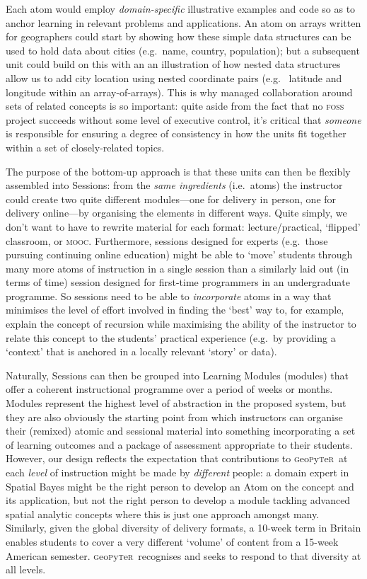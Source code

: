 \documentclass[letter, 11pt,titlepage]{article}
\newcommand{\gp}{\textsc{g}eo\textsc{p}y\textsc{t}e\textsc{r}~\/}
\newcommand{\eg}{e.g.~\/}
\newcommand{\ie}{i.e.~\/}
\begin{document}
Each atom would employ \emph{domain-specific} illustrative examples and code so
as to anchor learning in relevant problems and applications. An atom on arrays
written for geographers could start by showing how these simple data structures
can be used to hold data about cities (\eg name, country, population); but a
subsequent unit could build on this with an an illustration of how nested data
structures allow us to add city location using nested coordinate pairs (\eg
latitude and longitude within an array-of-arrays). This is why managed
collaboration around sets of related concepts is so important: quite aside from
the fact that no \textsc{foss} project succeeds without some level of executive
control, it's critical that \textit{someone} is responsible for ensuring a
degree of consistency in how the units fit together within a set of
closely-related topics.

The purpose of the bottom-up approach is that these units can then be flexibly
assembled into Sessions: from the \textit{same ingredients} (\ie atoms) the
instructor could create two quite different modules---one for delivery in
person, one for delivery online---by organising the elements in different ways.
Quite simply, we don't want to have to rewrite material for each format:
lecture/practical, `flipped' classroom, or \textsc{mooc}. Furthermore, sessions
designed for experts (\eg those pursuing continuing online education) might be
able to `move' students through many more atoms of instruction in a single
session than a similarly laid out (in terms of time) session designed for
first-time programmers in an undergraduate programme. So sessions need to be
able to \emph{incorporate} atoms in a way that minimises the level of effort
involved in finding the `best' way to, for example, explain the concept of
recursion while maximising the ability of the instructor to relate this concept
to the students' practical experience (\eg by providing a `context' that is
anchored in a locally relevant `story' or data).

Naturally, Sessions can then be grouped into Learning Modules (modules) that
offer a coherent instructional programme over a period of weeks or months.
Modules represent the highest level of abstraction in the proposed system, but
they are also obviously the starting point from which instructors can organise
their (remixed) atomic and sessional material into something incorporating a set
of learning outcomes and a package of assessment appropriate to their students.
However, our design reflects the expectation that contributions to \gp at each
\emph{level} of instruction might be made by \emph{different} people: a domain
expert in Spatial Bayes might be the right person to develop an Atom on the
concept and its application, but not the right person to develop a module
tackling advanced spatial analytic concepts where this is just one approach
amongst many. Similarly, given the global diversity of delivery formats, a
10-week term in Britain enables students to cover a very different `volume' of
content from a 15-week American semester. \gp recognises and seeks to respond to
that diversity at all levels.
\end{document}
